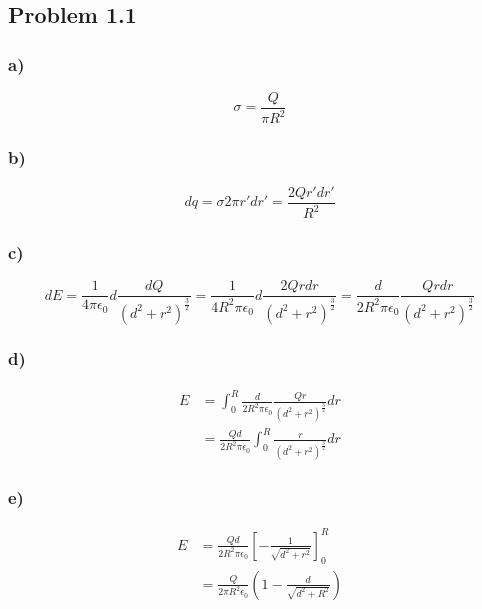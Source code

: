 \documentclass[../homework.tex]{subfiles}
\begin{document}
\subsection{Problem 1.1}
\subsubsection*{a)}
\begin{equation*}
    \sigma = \frac{Q}{\pi R^2}
\end{equation*}
\subsubsection*{b)}
\begin{equation*}
    dq = \sigma 2\pi r' dr' =  \frac{2Q r' dr'}{R^2}
\end{equation*}
\subsubsection*{c)}
\begin{equation*}
    dE = \frac{1}{4 \pi \epsilon_0} d\frac{dQ}{(d^2 + r^2)^\frac{3}{2}} = \frac{1}{4 R^2 \pi \epsilon_0} d\frac{2Q r dr}{(d^2 + r^2)^\frac{3}{2}} = \frac{d}{2 R^2 \pi \epsilon_0} \frac{Q r dr}{(d^2 + r^2)^\frac{3}{2}}
\end{equation*}
\subsubsection*{d)}
\begin{align*}
    E & = \int_{0}^{R} \frac{d}{2 R^2 \pi \epsilon_0} \frac{Q r}{(d^2 + r^2)^\frac{3}{2}} dr \\
      & = \frac{Qd}{2 R^2 \pi \epsilon_0}\int_{0}^{R} \frac{r}{(d^2 + r^2)^\frac{3}{2}} dr
\end{align*}
\subsubsection*{e)}
\begin{align*}
    E & = \frac{Qd}{2 R^2 \pi \epsilon_0} \left[
        - \frac{1}{\sqrt{d^2 + r^2}}
        \right]^R_0                            \\
      & = \frac{Q}{2 \pi R^2 \epsilon_0} \left(
    1 - \frac{d}{\sqrt{d^2 + R^2}}
    \right)
\end{align*}
\end{document}
